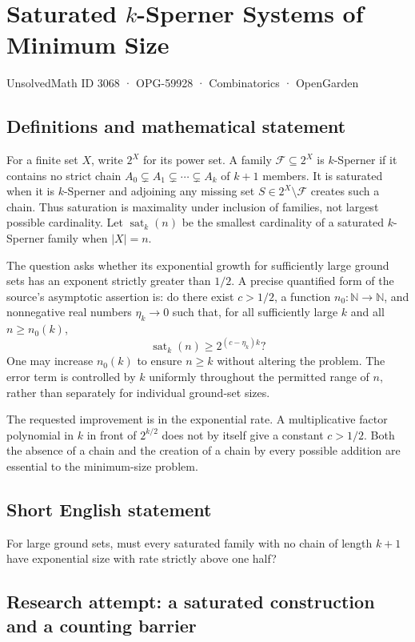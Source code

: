 \documentclass[11pt,a4paper]{article}
\begin{document}
\section*{Saturated $k$-Sperner Systems of Minimum Size}\label{3068}
{\small UnsolvedMath ID 3068 · OPG-59928 · Combinatorics · OpenGarden}
\subsection{Definitions and mathematical statement}
For a finite set $X$, write $2^X$ for its power set. A family
$\mathcal F\subseteq2^X$ is $k$-Sperner if it contains no strict chain
$A_0\subsetneq A_1\subsetneq\cdots\subsetneq A_k$ of $k+1$ members.
It is saturated when it is $k$-Sperner and adjoining any missing set
$S\in2^X\setminus\mathcal F$ creates such a chain. Thus saturation is
maximality under inclusion of families, not largest possible cardinality.
Let $\operatorname{sat}_k(n)$ be the smallest cardinality of a saturated
$k$-Sperner family when $|X|=n$.

The question asks whether its exponential growth for sufficiently large
ground sets has an exponent strictly greater than $1/2$. A precise
quantified form of the source's asymptotic assertion is: do there exist
$c>1/2$, a function $n_0:\mathbb N\to\mathbb N$, and nonnegative real
numbers $\eta_k\to0$ such that, for all sufficiently large $k$ and all
$n\ge n_0(k)$,
\[
 \operatorname{sat}_k(n)\ge 2^{(c-\eta_k)k}?
\]
One may increase $n_0(k)$ to ensure $n\ge k$ without altering the problem.
The error term is controlled by $k$ uniformly throughout the permitted
range of $n$, rather than separately for individual ground-set sizes.

The requested improvement is in the exponential rate. A multiplicative
factor polynomial in $k$ in front of $2^{k/2}$ does not by itself give a
constant $c>1/2$. Both the absence of a chain and the creation of a chain
by every possible addition are essential to the minimum-size problem.
\subsection{Short English statement}
For large ground sets, must every saturated family with no chain of length $k+1$ have exponential size with rate strictly above one half?
\subsection{Research attempt: a saturated construction and a counting barrier}
\end{document}
